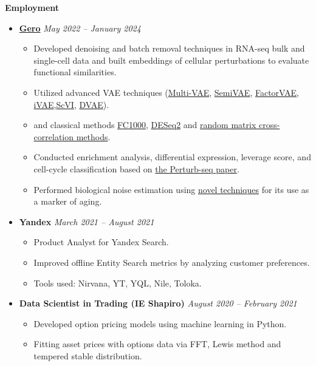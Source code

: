 \documentclass[12pt]{article}
\begin{document}
\noindent \textbf{\Large Employment}
\begin{itemize}
    \item \href{https://gero.ai/}{\textbf{Gero}} \hfill \textit{May 2022 -- January 2024}
    \begin{itemize}
        \item Developed denoising and batch removal techniques in RNA-seq bulk and single-cell data and built embeddings of cellular perturbations to evaluate functional similarities.
        \item Utilized advanced VAE techniques (\href{https://openaccess.thecvf.com/content/ICCV2021/papers/Xu_Multi-VAE_Learning_Disentangled_View-Common_and_View-Peculiar_Visual_Representations_for_Multi-View_ICCV_2021_paper.pdf}{Multi-VAE}, \href{https://arxiv.org/abs/1603.02514}{SemiVAE}, \href{https://arxiv.org/abs/1802.05983}{FactorVAE}, \href{https://arxiv.org/abs/1907.04809}{iVAE},\href{https://docs.scvi-tools.org/en/stable/api/reference/scvi.model.SCVI.html#scvi.model.SCVI}{ScVI}, \href{https://arxiv.org/abs/1509.05982}{DVAE}).
        \item and classical methods \href{https://www.degruyter.com/document/doi/10.1515/sagmb-2016-0072/html}{FC1000}, \href{https://genomebiology.biomedcentral.com/articles/10.1186/s13059-014-0550-8}{DESeq2} and \href{https://arxiv.org/abs/cond-mat/0108023}{random matrix cross-correlation methods}. 
        \item Conducted enrichment analysis, differential expression, leverage score, and cell-cycle classification 
              based on \href{https://pubmed.ncbi.nlm.nih.gov/35688146/}{the Perturb-seq paper}.
        \item Performed biological noise estimation using \href{https://www.biorxiv.org/content/10.1101/2022.06.23.497402v1}{novel techniques} for its use as a marker of aging.
    \end{itemize}

    \item \textbf{Yandex} \hfill \textit{March 2021 -- August 2021}
    \begin{itemize}
        \item Product Analyst for Yandex Search.
        \item Improved offline Entity Search metrics by analyzing customer preferences.
        \item Tools used: Nirvana, YT, YQL, Nile, Toloka.
    \end{itemize}

    \item \textbf{Data Scientist in Trading (IE Shapiro)} \hfill \textit{August 2020 -- February 2021}
    \begin{itemize}
        \item Developed option pricing models using machine learning in Python.
        \item Fitting asset prices with options data via FFT, Lewis method and tempered stable distribution.

    \end{itemize}

\end{itemize}
\end{document}
